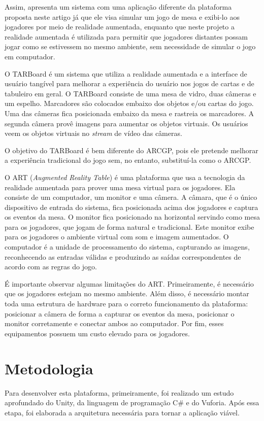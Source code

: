\documentclass[conference]{IEEEtran}
\begin{document}
Assim, \cite{Szalavari:1998:CGA:293701.293740} apresenta um sistema com uma 
aplicação diferente da plataforma proposta neste artigo já que ele visa simular 
um jogo de mesa e exibi-lo aos jogadores por meio de realidade aumentada, 
enquanto que neste projeto a realidade aumentada é utilizada para permitir que 
jogadores distantes possam jogar como se estivessem no mesmo ambiente, sem 
necessidade de simular o jogo em computador.

O TARBoard \cite{lee2005tarboard} é um sistema que utiliza a realidade aumentada 
e a interface de usuário tangível para melhorar a experiência do usuário nos 
jogos de cartas e de tabuleiro em geral. O TARBoard consiste de uma mesa de 
vidro, duas câmeras e um espelho. Marcadores são colocados embaixo dos objetos 
e/ou cartas do jogo. Uma das câmeras fica posicionada embaixo da mesa e rastreia 
os marcadores. A segunda câmera provê imagens para aumentar os objetos virtuais. 
Os usuários veem os objetos virtuais no \textit{stream} de vídeo das câmeras.

O objetivo do TARBoard é bem diferente do ARCGP, pois ele pretende melhorar a 
experiência tradicional do jogo sem, no entanto, substituí-la como o ARCGP.

O ART (\textit{Augmented Reality Table}) \cite{Lam:2006:AAR:1128923.1128987} é 
uma plataforma que usa a tecnologia da realidade aumentada para prover uma mesa 
virtual para os jogadores. Ela consiste de um computador, um monitor e uma 
câmera. A câmara, que é o único dispositivo de entrada do sistema, fica 
posicionada acima dos jogadores e captura os eventos da mesa. O monitor fica 
posicionado na horizontal servindo como mesa para os jogadores, que jogam de 
forma natural e tradicional. Este monitor exibe para os jogadores o ambiente 
virtual com som e imagem aumentados. O computador é a unidade de processamento 
do sistema, capturando as imagens, reconhecendo as entradas válidas e produzindo 
as saídas correspondentes de acordo com as regras do jogo.

É importante observar algumas limitações do ART. Primeiramente, é necessário 
que os jogadores estejam no mesmo ambiente. Além disso, é necessário montar 
toda uma estrutura de hardware para o correto funcionamento da plataforma: 
posicionar a câmera de forma a capturar os eventos da mesa, posicionar o monitor 
corretamente e conectar ambos ao computador. Por fim, esses equipamentos 
possuem um custo elevado para os jogadores.

\section{Metodologia}
\label{metodologia}
Para desenvolver esta plataforma, primeiramente, foi realizado um estudo 
aprofundado do Unity, da linguagem de programação C\# \cite{csharp} e do 
Vuforia. Após essa etapa, foi elaborada a arquitetura necessária para tornar a 
aplicação viável.
\end{document}
